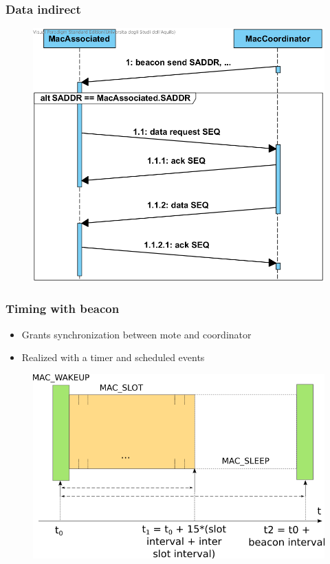 \begin{frame}[fragile]
  \frametitle{Data indirect}
  \begin{figure}
    \centering
    \includegraphics[width=.7\textwidth]{img/DataRequest.png}
  \end{figure}
\end{frame}

\begin{frame}[fragile]
  \frametitle{Timing with beacon}
  \begin{itemize}
    \item Grants synchronization between mote and coordinator
    \item Realized with a timer and scheduled events
  \end{itemize}
  \begin{figure}
    \centering
    \includegraphics[width=.7\textwidth]{img/MAC_STATES.png}
  \end{figure}
\end{frame}


